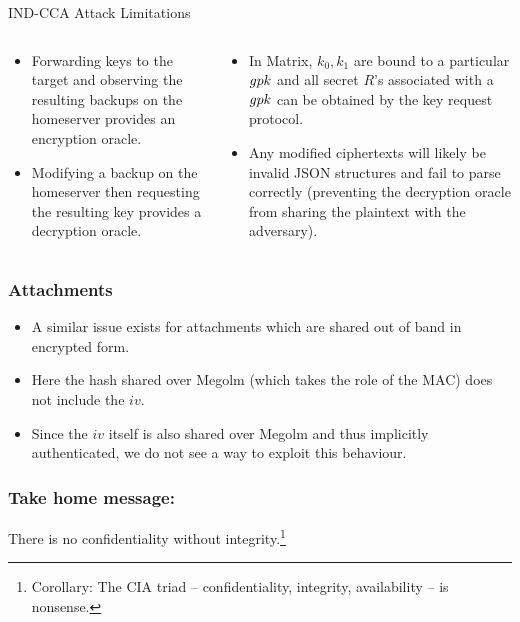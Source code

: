 \documentclass[aspectratio=169]{beamer}
\begin{document}
\begin{frame}{IND-CCA Attack Limitations}
  \begin{columns}[t]
    \begin{column}{0.5\columnwidth}
      \begin{itemize}
      \item Forwarding keys to the target and observing the resulting backups on the homeserver provides an encryption oracle.

      \item Modifying a backup on the homeserver then requesting the resulting key provides a decryption oracle.
      \end{itemize}
    \end{column}
    \begin{column}{0.5\columnwidth}

      \begin{itemize}
      \item In Matrix, \(k_{0}, k_{1}\) are bound to a particular \(\MegolmPK\) and all secret \(R\)'s associated with a \(\MegolmPK\) can be obtained by the key request protocol.
      \item Any modified ciphertexts will likely be invalid JSON structures and fail to parse correctly (preventing the decryption oracle from sharing the plaintext with the adversary).
      \end{itemize}
    \end{column}
  \end{columns}
\end{frame}

\begin{frame}
  \frametitle{Attachments}

  \begin{itemize}
  \item A similar issue exists for attachments which are shared out of band in encrypted form.
  \item Here the hash shared over Megolm (which takes the role of the MAC) does not include the \(iv\)\@.
  \item Since the \(iv\) itself is also shared over Megolm and thus implicitly authenticated, we do not see a way to exploit this behaviour.
  \end{itemize}
\end{frame}

\begin{frame}
  \frametitle{Take home message:}

  There is no confidentiality without integrity.\footnote{Corollary: The CIA triad -- confidentiality, integrity, availability -- is nonsense.}

\end{frame}
\end{document}
